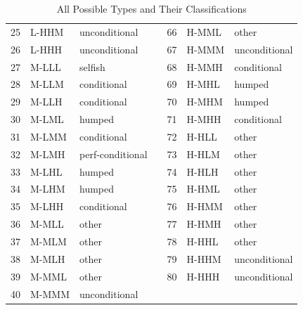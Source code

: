 \documentclass[12pt]{article}
\begin{document}
\begin{table}[ht]
{\begin{tabular}{|lll|c|lll|}
  25 & L-HHM & unconditional &  &   66 & H-MML & other \\ 
  26 & L-HHH & unconditional &  &   67 & H-MMM & unconditional \\ 
  27 & M-LLL & selfish &  &   68 & H-MMH & conditional \\ 
  28 & M-LLM & conditional &  &   69 & H-MHL & humped \\ 
  29 & M-LLH & conditional &  &   70 & H-MHM & humped \\ 
  30 & M-LML & humped &  &   71 & H-MHH & conditional \\ 
  31 & M-LMM & conditional &  &   72 & H-HLL & other \\ 
  32 & M-LMH & perf-conditional &  &   73 & H-HLM & other \\ 
  33 & M-LHL & humped &  &   74 & H-HLH & other \\ 
  34 & M-LHM & humped &  &   75 & H-HML & other \\ 
  35 & M-LHH & conditional &  &   76 & H-HMM & other \\ 
  36 & M-MLL & other &  &   77 & H-HMH & other \\ 
  37 & M-MLM & other &  &   78 & H-HHL & other \\ 
  38 & M-MLH & other &  &   79 & H-HHM & unconditional \\ 
  39 & M-MML & other &  &   80 & H-HHH & unconditional \\ 
  40 & M-MMM & unconditional &  &  & & \\ \hline 
\end{tabular}
}
\caption{All Possible Types and Their Classifications}
\label{tbl:evo-alltypes}
\end{table}
\end{document}
